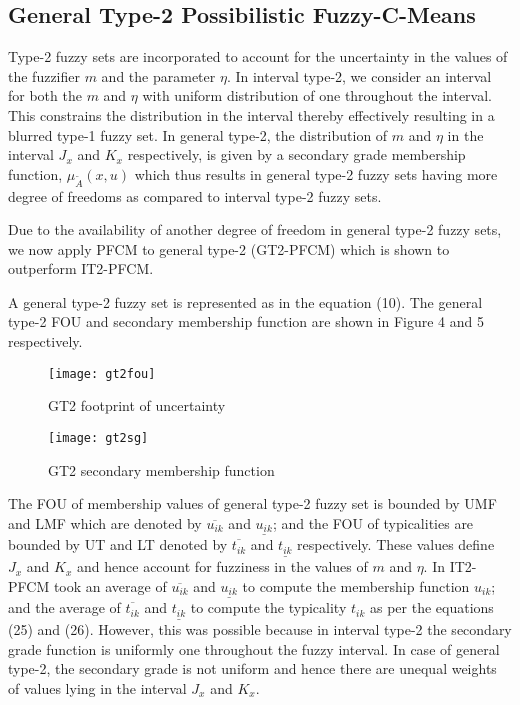 \documentclass[journal, onecolumn]{IEEEtran}
\begin{document}
\subsection{General Type-2 Possibilistic Fuzzy-C-Means}
Type-2 fuzzy sets are incorporated to account for the uncertainty in the values of the fuzzifier $m$ and the parameter $\eta$. In interval type-2, we consider an interval for both the $m$ and $\eta$ with uniform distribution of one throughout the interval. This constrains the distribution in the interval thereby effectively resulting in a blurred type-1 fuzzy set. In general type-2, the distribution of $m$ and $\eta$ in the interval $J_x$ and $K_x$ respectively, is given by a secondary grade membership function, $\mu_{\tilde{A}}(x,u)$  which thus results in general type-2 fuzzy sets having more degree of freedoms as compared to interval type-2 fuzzy sets. 

Due to the availability of another degree of freedom in general type-2 fuzzy sets, we now apply PFCM to general type-2 (GT2-PFCM) which is shown to outperform IT2-PFCM. 

A general type-2 fuzzy set is represented as in the equation (10). The general type-2 FOU and secondary membership function are shown in Figure 4 and 5 respectively. 

\begin{figure}[htb]
\begin{minipage}{0.5\textwidth}
  \centering
  \texttt{[image: gt2fou]}
  \caption{GT2 footprint of uncertainty}
\end{minipage}%
\begin{minipage}{0.5\textwidth}
  \centering
  \texttt{[image: gt2sg]}
  \caption{GT2 secondary membership function}
\end{minipage}%
\end{figure}




The FOU of membership values of  general type-2 fuzzy set is bounded by UMF and LMF which are denoted by $\overline{u_{ik}}$ and $\underline{u_{ik}}$; and the FOU of typicalities are bounded by UT and LT denoted by $\overline{t_{ik}}$ and $\underline{t_{ik}}$  respectively. These values define  $J_x$ and $K_x$ and hence account for fuzziness in the values of $m$ and $\eta$. 
In IT2-PFCM took an average of $\overline{u_{ik}}$ and $\underline{u_{ik}}$ to compute the membership function $u_{ik}$; and the average of $\overline{t_{ik}}$ and $\underline{t_{ik}}$ to compute the typicality $t_{ik}$ as per the equations (25) and (26). However, this was possible because in interval type-2 the secondary grade function is uniformly one throughout the fuzzy interval. In case of general type-2, the secondary grade is not uniform and hence there are unequal weights of values lying in the interval $J_x$ and $K_x$. 
\end{document}

